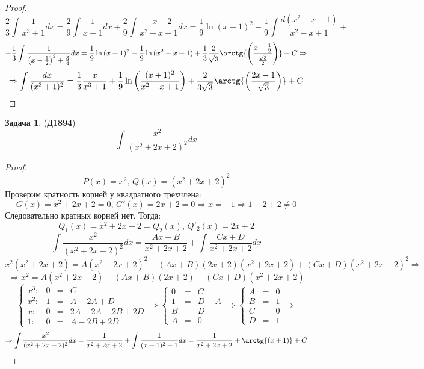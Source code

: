 \documentclass[12pt]{article}
\theoremstyle{definition}
\newtheorem{problem}{Задача}
\DeclareMathOperator{\dint}{\displaystyle\int}
\begin{document}
\begin{proof}
$$	$$
	$$
		\dfrac{2}{3} \dint\dfrac{1}{x^3 + 1}dx = \dfrac{2}{9}\dint\dfrac{1}{x+ 1} dx + \dfrac{2}{9}\dint\dfrac{-x + 2}{x^2 - x + 1}dx = \dfrac{1}{9}\ln{(x+1)^2} - \dfrac{1}{9}\dint \dfrac{d(x^2 - x + 1)}{x^2 - x + 1} + 
	$$
	$$
		+ \dfrac{1}{3}\dint \dfrac{1}{\left(x - \frac{1}{2}\right)^2  + \frac{3}{4}}dx = \dfrac{1}{9}\ln{(x+1)^2} - \dfrac{1}{9}\ln{(x^2 - x + 1)} + \dfrac{1}{3}\dfrac{2}{\sqrt{3}}\arctg{\left(\dfrac{x - \frac{1}{2}}{\frac{\sqrt{3}}{2}}\right)} + C \Rightarrow 
	$$
	$$
		\Rightarrow	\dint \dfrac{dx}{(x^3 + 1)^2 } = \dfrac{1}{3}\dfrac{ x }{x^3 +1} + \dfrac{1}{9}\ln{\left(\dfrac{(x + 1)^2}{x^2 - x + 1}\right)} + \dfrac{2}{3\sqrt{3}}\arctg{\left(\dfrac{2x - 1}{\sqrt{3}}\right)} + C
	$$
\end{proof}

\newpage
\begin{problem}(\textbf{Д1894})
	$$
		\dint \dfrac{x^2}{(x^2 + 2x + 2)^2}dx
	$$
\end{problem}

\begin{proof}
	$$
		P(x) = x^2, \, Q(x) = (x^2 + 2x + 2)^2
	$$
	Проверим кратность корней у квадратного трехчлена:
	$$
		G(x) = x^2 + 2x + 2 = 0, \, G'(x) = 2x + 2 = 0 \Rightarrow x = -1 \Rightarrow 1 - 2 + 2 \neq 0
	$$
	Следовательно кратных корней нет. Тогда:
	$$
		Q_1(x) = x^2 + 2x + 2 = Q_2(x), \, Q'_2(x) = 2x + 2
	$$
	$$
		\dint \dfrac{x^2}{(x^2 + 2x + 2)^2}dx = \dfrac{Ax + B}{x^2 + 2x + 2} + \dint \dfrac{Cx + D}{x^2 + 2x + 2}dx
	$$
	$$
		x^2 (x^2 + 2x + 2) = A(x^2 + 2x + 2)^2  - (Ax + B)(2x + 2)(x^2 + 2x + 2) + (Cx + D)(x^2 + 2x + 2)^2 \Rightarrow
	$$
	$$
		\Rightarrow x^2 = A(x^2 + 2x + 2) - (Ax +  B)(2x + 2) + (Cx + D)(x^2 + 2x + 2)
	$$
	$$
		\left\{
			\begin{array}{ccccc}
				x^3 \colon &  0 & = & C\\
				x^2 \colon & 1 & = & A -2A +D \\
				x \colon & 0 & = & 2A - 2A - 2B + 2D\\
				1 \colon & 0 &=& A -2B +2D
			\end{array}
		\right. \Rightarrow
		\left\{
			\begin{array}{ccc}
				0 & = & C \\
				1 & = & D - A \\
				B & = & D \\
				A & = & 0
			\end{array}
		\right. \Rightarrow 
		\left\{
			\begin{array}{ccc}
				A & = & 0 \\
				B & = & 1 \\
				C & = & 0 \\
				D & = & 1
			\end{array}
		\right. \Rightarrow
	$$
	$$
		\Rightarrow \dint \dfrac{x^2}{(x^2 + 2x + 2)^2}dx = \dfrac{1}{x^2 + 2x + 2} + \dint \dfrac{1}{(x + 1)^2 + 1}dx = \dfrac{1}{x^2 + 2x + 2} + \arctg{\left( x + 1\right)} + C
	$$
\end{proof}
\end{document}
